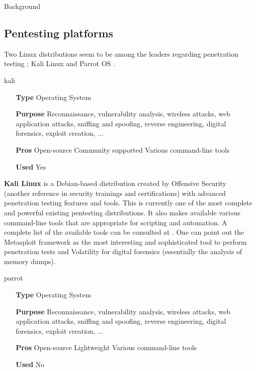 \begin{chaptercover}{Background}
\subsection{Pentesting platforms}

Two Linux distributions seem to be among the leaders regarding penetration testing ; Kali Linux \cite{kali-linux} and Parrot OS \cite{parrot-os}.

\begin{solutiondata}{kali}
\begin{itemize}[labelsep=1cm]
  \item [\textbf{Type}] Operating System
  \item [\textbf{Purpose}] Reconnaissance, vulnerability analysis, wireless attacks, web application attacks, sniffing and spoofing, reverse engineering, digital forensics, exploit creation, ...
  \item [\textbf{Pros}] Open-source \newline Community supported \newline Various command-line tools
  \item [\textbf{Used}] Yes
\end{itemize}
\end{solutiondata}

{
\textbf{Kali Linux} \cite{kali-linux} is a Debian-based distribution created by Offensive Security \cite{offensive-security} (another reference in security trainings and certifications) with advanced penetration testing features and tools. This is currently one of the most complete and powerful existing pentesting distributions. It also makes available various command-line tools that are appropriate for scripting and automation. A complete list of the available tools can be consulted at \cite{kali-linux-tools}. One can point out the Metasploit framework \cite{metasploit} as the most interesting and sophisticated tool to perform penetration tests and Volatility \cite{volatility} for digital forensics (essentially the analysis of memory dumps).}

\begin{solutiondata}{parrot}
\begin{itemize}[labelsep=1cm]
  \item [\textbf{Type}] Operating System
  \item [\textbf{Purpose}] Reconnaissance, vulnerability analysis, wireless attacks, web application attacks, sniffing and spoofing, reverse engineering, digital forensics, exploit creation, ...
  \item [\textbf{Pros}] Open-source \newline Lightweight \newline Various command-line tools
  \item [\textbf{Used}] No
\end{itemize}
\end{solutiondata}


\end{chaptercover}
